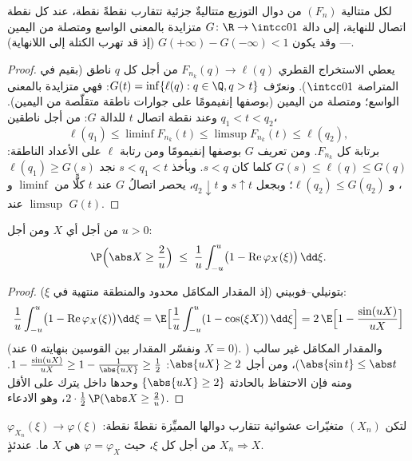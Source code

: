 \begin{theorem}
\label{thm:b3:clt:helly}
لكل متتالية $(F_n)$ من دوال التوزيع متتاليةٌ جزئية تتقارب نقطةً
نقطة، عند كل نقطة اتصال للنهاية، إلى دالة $G \colon
\R \to \intcc01$ متزايدة
بالمعنى الواسع ومتصلة من اليمين --- وقد يكون $G(+\infty) - G(-\infty) <
1$ (إذ قد
تهرب الكتلة إلى اللانهاية).
\end{theorem}

\begin{proof}
يعطي الاستخراج القطري $F_{n_k}(q) \to \ell(q)$ من أجل كل $q$ ناطق (بقيم في
المتراصة $\intcc01$). ونعرّف $G(t) = \inf\{\ell(q) : q \in \Q, q > t\}$: فهي متزايدة بالمعنى الواسع؛
ومتصلة من اليمين (بوصفها إنفيمومًا على جوارات ناطقة متقلّصة من
اليمين). وعند نقطة اتصال $t$ للدالة $G$: من أجل ناطقين
$q_1 < t < q_2$،
\[
\ell(q_1) \leq \liminf F_{n_k}(t) \leq \limsup F_{n_k}(t)
\leq \ell(q_2),
\]
برتابة كل $F_{n_k}$. ومن تعريف $G$ بوصفها إنفيمومًا ومن رتابة
$\ell$ على الأعداد الناطقة: $G(s) \leq \ell(q) \leq G(q)$ كلما كان $s < q$. وبأخذ
$s < q_1 < t$ نجد $\ell(q_1) \geq G(s)$، و $\ell(q_2) \leq G(q_2)$؛ وبجعل $s \uparrow t$
و $q_2
\downarrow t$، يحصر اتصالُ $G$ عند $t$ كلًّا من $\liminf$ و
$\limsup$ عند $G(t)$.
\end{proof}

\begin{lemma}
\label{lem:b3:clt:tightness}
من أجل أي  $X$ ومن أجل $u > 0$:
\[
\P\Bigl(\abs X \geq \frac2u\Bigr) \;\leq\;
\frac1u\int_{-u}^{u}\bigl(1 -
\operatorname{Re}\varphi_X(\xi)\bigr)\,\dd\xi .
\]
\end{lemma}

\begin{proof}
بتونيلي--فوبيني (إذ المقدار المكامَل محدود والمنطقة منتهية في
$\xi$):
\[
\frac1u\int_{-u}^u\bigl(1 -
\operatorname{Re}\varphi_X(\xi)\bigr)\dd\xi
= \E\Bigl[\frac1u\int_{-u}^u(1 - \cos(\xi X))\,\dd\xi\Bigr]
= 2\,\E\Bigl[1 - \frac{\sin(uX)}{uX}\Bigr]
\]
(ونفسّر المقدار بين القوسين بنهايته $0$ عند $X = 0$). والمقدار
المكامَل غير سالب ($\abs{\sin t} \leq \abs t$)، ومن أجل $\abs{uX} \geq 2$: $1 - \frac{\sin(uX)}{uX} \geq 1 -
\frac1{\abs{uX}} \geq \frac12$. ومنه فإن
الاحتفاظ بالحادثة $\{\abs{uX} \geq 2\}$ وحدها داخل  يترك على الأقل
$2 \cdot \frac12\,\P(\abs X \geq \frac2u)$، وهو الادعاء.
\end{proof}

\begin{theorem}
\label{thm:b3:clt:levy}
لتكن $(X_n)$ متغيّرات عشوائية تتقارب دوالها المميِّزة نقطةً
نقطة: $\varphi_{X_n}(\xi) \to
\varphi(\xi)$ من أجل كل $\xi$، حيث $\varphi =
\varphi_X$ هي 
 $X$ ما. عندئذٍ $X_n \Rightarrow X$.
\end{theorem}

